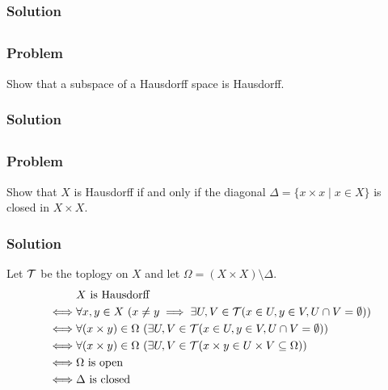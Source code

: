 \subsubsection{Solution}
\todo


\setcounter{subsection}{11} %
\subsection{}

\subsubsection{Problem}
Show that a subspace of a Hausdorff space is Hausdorff.
\subsubsection{Solution}
\todo


\setcounter{subsection}{12} %
\subsection{}
\subsubsection{Problem}
Show that $X$ is Hausdorff if and only if the diagonal $\Delta = \{x \times x \mid x \in X\}$ is closed in $X \times X$.
\subsubsection{Solution}
Let $\mathcal T$ be the toplogy on $X$ and let $\Omega = (X \times X) \setminus \Delta$.
\begin{align*}
& X \textrm{ is Hausdorff} \\
\iff& \forall x,y \in X \ (x \neq y \implies \exists U, V \in \mathcal T (x \in U, y \in V, U \cap V = \emptyset)) \\
\iff& \forall (x \times y) \in \Omega \ ( \exists U, V \in \mathcal T (x \in U, y \in V, U \cap V = \emptyset)) \\
\iff& \forall (x \times y) \in \Omega \ ( \exists U, V \in \mathcal T ( x \times y \in U \times V \subseteq \Omega)) \\
\iff& \Omega \textrm{ is open} \\
\iff& \Delta \textrm{ is closed}
\end{align*}

